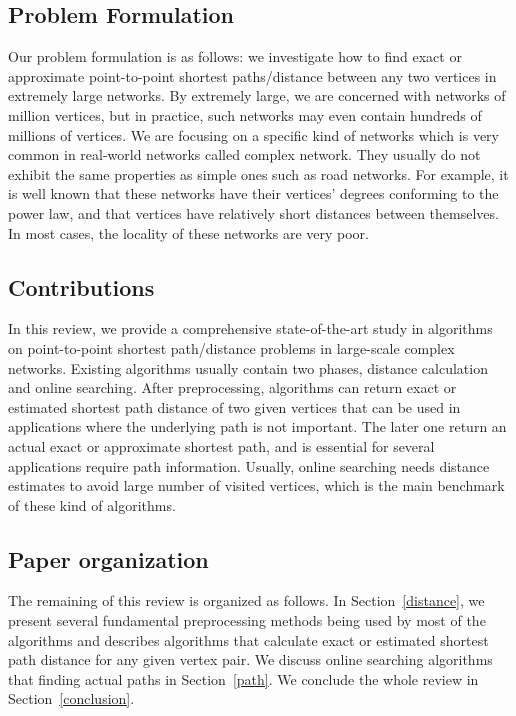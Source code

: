 \subsection{Problem Formulation}

Our problem formulation is as follows: we investigate how to find exact or approximate point-to-point shortest paths/distance between any two vertices in extremely large networks. By extremely large, we are concerned with networks of million vertices, but in practice, such networks may even contain hundreds of millions of vertices. We are focusing on a specific kind of networks which is very common in real-world networks called complex network. They usually do not exhibit the same properties as simple ones such as road networks. For example, it is well known that these networks have their vertices' degrees conforming to the power law, and that vertices have relatively short distances between themselves. In most cases, the locality of these networks are very poor.

\subsection{Contributions}

In this review, we provide a comprehensive state-of-the-art study in algorithms on point-to-point shortest path/distance problems in large-scale complex networks. Existing algorithms usually contain two phases, distance calculation and online searching. After preprocessing, algorithms can return exact or estimated shortest path distance of two given vertices that can be used in applications where the underlying path is not important. The later one return an actual exact or approximate shortest path, and is essential for several applications require path information. Usually, online searching needs distance estimates to avoid large number of visited vertices, which is the main benchmark of these kind of algorithms.

\subsection{Paper organization}

The remaining of this review is organized as follows. In Section~\ref{distance}, we present several fundamental preprocessing methods being used by most of the algorithms and describes algorithms that calculate exact or estimated shortest path distance for any given vertex pair. We discuss online searching algorithms that finding actual paths in Section~\ref{path}. We conclude the whole review in Section~\ref{conclusion}.
